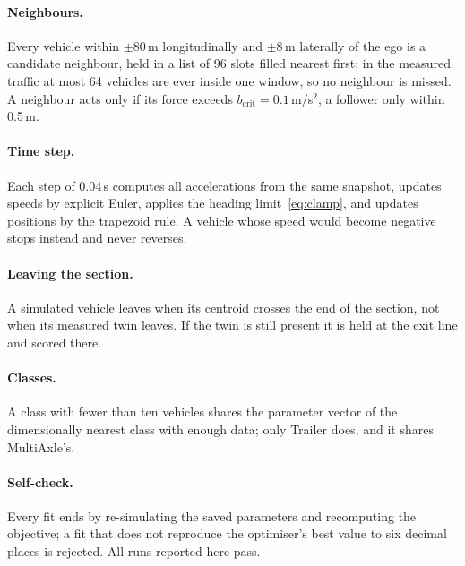 \documentclass[11pt]{article}
\begin{document}
\paragraph{Neighbours.} Every vehicle within $\pm80$\,m longitudinally and
$\pm8$\,m laterally of the ego is a candidate neighbour, held in a list of 96
slots filled nearest first; in the measured traffic at most 64 vehicles are ever
inside one window, so no neighbour is missed. A neighbour acts only if its force
exceeds $b_{\mathrm{crit}}=0.1$\,m/s$^2$, a follower only within 0.5\,m.

\paragraph{Time step.} Each step of 0.04\,s computes all accelerations from the
same snapshot, updates speeds by explicit Euler, applies the heading
limit~\eqref{eq:clamp}, and updates positions by the trapezoid rule. A vehicle
whose speed would become negative stops instead and never reverses.

\paragraph{Leaving the section.} A simulated vehicle leaves when its centroid
crosses the end of the section, not when its measured twin leaves. If the twin
is still present it is held at the exit line and scored there.

\paragraph{Classes.} A class with fewer than ten vehicles shares the parameter
vector of the dimensionally nearest class with enough data; only Trailer does,
and it shares MultiAxle's.

\paragraph{Self-check.} Every fit ends by re-simulating the saved parameters and
recomputing the objective; a fit that does not reproduce the optimiser's best
value to six decimal places is rejected. All runs reported here pass.
\end{document}
